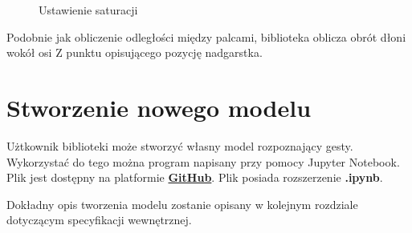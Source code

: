 \begin{figure}[H]
    \centering
    \hfill
    \caption{Ustawienie saturacji}
\end{figure}


\quad Podobnie jak obliczenie odległości między palcami, biblioteka oblicza obrót dłoni wokół osi Z punktu opisującego pozycję nadgarstka.


\section{Stworzenie nowego modelu}

\quad Użtkownik biblioteki może stworzyć własny model rozpoznający gesty. Wykorzystać do tego można program napisany przy pomocy Jupyter Notebook. Plik jest dostępny na platformie \href{https://github.com/szymciem8/OpenLeap/blob/main/Jupyter%20Notebook/Create%20your%20own%20model/Gesture%20Detection.ipynb}{\textbf{GitHub}}. Plik posiada rozszerzenie \textbf{.ipynb}.

\quad Dokładny opis tworzenia modelu zostanie opisany w kolejnym rozdziale dotyczącym specyfikacji wewnętrznej. 